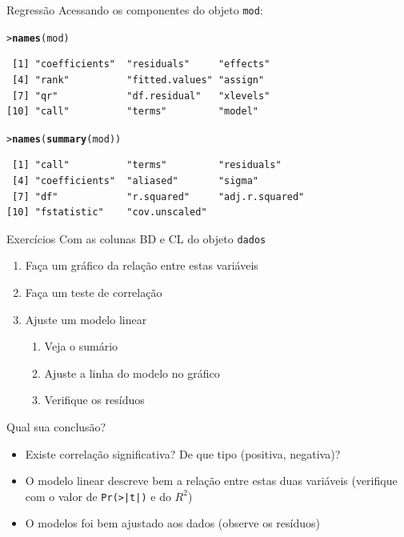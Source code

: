 \documentclass[10pt]{beamer}\usepackage[]{graphicx}\usepackage[]{color}
\makeatletter
\newcommand{\hlstd}[1]{\textcolor[rgb]{0.345,0.345,0.345}{#1}}%
\newcommand{\hlkwd}[1]{\textcolor[rgb]{0.282,0.239,0.545}{\textbf{#1}}}%
\newenvironment{kframe}{%
 \def\at@end@of@kframe{}%
 \ifinner\ifhmode%
  \def\at@end@of@kframe{\end{minipage}}%
  \begin{minipage}{\columnwidth}%
 \fi\fi%
 \def\FrameCommand##1{\hskip\@totalleftmargin \hskip-\fboxsep
 \colorbox{shadecolor}{##1}\hskip-\fboxsep
     \hskip-\linewidth \hskip-\@totalleftmargin \hskip\columnwidth}%
 \MakeFramed {\advance\hsize-\width
   \@totalleftmargin\z@ \linewidth\hsize
   \@setminipage}}%
 {\par\unskip\endMakeFramed%
 \at@end@of@kframe}
\newenvironment{knitrout}{}{} %
\makeatother
\begin{document}
\begin{frame}[fragile=singleslide]{Regressão}
Acessando os componentes do objeto \texttt{mod}:
\begin{knitrout}\small
{}\color{fgcolor}\begin{kframe}
\begin{alltt}
\hlstd{> }\hlkwd{names}\hlstd{(mod)}
\end{alltt}
\begin{verbatim}
 [1] "coefficients"  "residuals"     "effects"      
 [4] "rank"          "fitted.values" "assign"       
 [7] "qr"            "df.residual"   "xlevels"      
[10] "call"          "terms"         "model"        
\end{verbatim}
\begin{alltt}
\hlstd{> }\hlkwd{names}\hlstd{(}\hlkwd{summary}\hlstd{(mod))}
\end{alltt}
\begin{verbatim}
 [1] "call"          "terms"         "residuals"    
 [4] "coefficients"  "aliased"       "sigma"        
 [7] "df"            "r.squared"     "adj.r.squared"
[10] "fstatistic"    "cov.unscaled" 
\end{verbatim}
\end{kframe}
\end{knitrout}

\end{frame}

\begin{frame}[fragile=singleslide]{Exercícios}
Com as colunas BD e CL do objeto \texttt{dados}
\begin{enumerate}
\item Faça um gráfico da relação entre estas variáveis
\item Faça um teste de correlação
\item Ajuste um modelo linear
  \begin{enumerate}
  \item Veja o sumário
  \item Ajuste a linha do modelo no gráfico
  \item Verifique os resíduos
  \end{enumerate}
\end{enumerate}
Qual sua conclusão?
\small
\begin{itemize}
\item Existe correlação significativa? De que tipo (positiva, negativa)?
\item O modelo linear descreve bem a relação entre estas duas variáveis
  (verifique com o valor de \verb+Pr(>|t|)+ e do $R^2$)
\item O modelos foi bem ajustado aos dados (observe os resíduos)
\end{itemize}
\end{frame}
\end{document}
